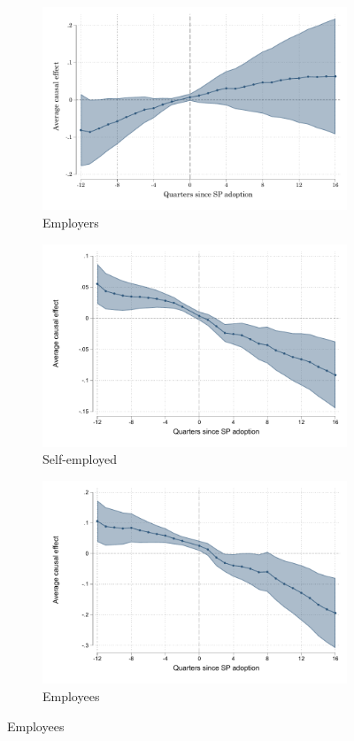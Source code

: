 \begin{figure}[H]
     \caption{More municipalities}
    \label{es_more_mun}
\begin{center}
       \begin{subfigure}{0.325\textwidth}
    \caption{Employers}
        \includegraphics[width=\textwidth]{Figuras/did_event_mun_p_t.pdf}
    \end{subfigure}
    \begin{subfigure}{0.325\textwidth}
        \caption{Self-employed}
        \includegraphics[width=\textwidth]{Figuras/did_event_mun_p_1.pdf}
    \end{subfigure}
        \begin{subfigure}{0.325\textwidth}
    \caption{Employees}
        \includegraphics[width=\textwidth]{Figuras/did_event_mun_e_t.pdf}

\end{subfigure}
\end{center}
\end{figure}
